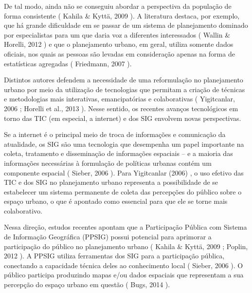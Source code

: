 \documentclass{article}
\begin{document}
De tal modo, ainda não se conseguiu abordar a perspectiva da população de forma
				consistente (%
Kahila \& Kyttä, 2009%
). A
				literatura destaca, por exemplo, que há grande dificuldade em se passar de um
				sistema de planejamento dominado por especialistas para um que daria voz a
				diferentes interessados (%
Wallin \& Horelli,
					2012%
) e que o planejamento urbano, em geral, utiliza somente dados
				oficiais, nos quais as pessoas são levadas em consideração apenas na forma de
				estatísticas agregadas (%
Friedmann,
				2007%
).

Distintos autores defendem a necessidade de uma reformulação no planejamento urbano
				por meio da utilização de tecnologias que permitam a criação de técnicas e
				metodologias mais interativas, emancipatórias e colaborativas (%
Yigitcanlar, 2006%
; %
Horelli et
					al., 2013%
). Nesse sentido, os recentes avanços tecnológicos em torno das
				TIC (em especial, a internet) e dos SIG envolvem novas perspectivas.

Se a internet é o principal meio de troca de informações e comunicação da atualidade,
				os SIG são uma tecnologia que desempenha um papel importante na coleta, tratamento e
				disseminação de informações espaciais – e a maioria das informações necessárias à
				formulação de políticas urbanas contém um componente espacial (%
Sieber, 2006%
). Para %
Yigitcanlar (2006)%
, o uso efetivo das TIC e dos SIG no planejamento
				urbano representa a possibilidade de se estabelecer um sistema permanente de coleta
				das percepções do público sobre o espaço urbano, o que é apontado como essencial
				para que ele se torne mais colaborativo.

Nessa direção, estudos recentes apontam que a Participação Pública com Sistema de
				Informação Geográfica (PPSIG) possui potencial para aprimorar a participação do
				público no planejamento urbano (%
Kahila \& Kyttä,
					2009%
; %
Poplin, 2012%
). A PPSIG
				utiliza ferramentas dos SIG para a participação pública, conectando a capacidade
				técnica deles ao conhecimento local (%
Sieber,
					2006%
). O público participa produzindo mapas e/ou dados espaciais que
				representam a sua percepção do espaço urbano em questão (%
Bugs, 2014%
).
\end{document}
